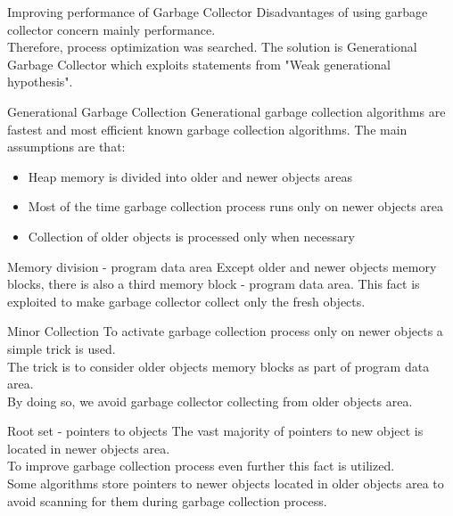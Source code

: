 \documentclass[presentation]{beamer}
\begin{document}
\begin{frame}{Improving performance of Garbage Collector}
	Disadvantages of using garbage collector concern mainly performance. 
	\\Therefore, process optimization was searched.
	\newline
	The solution is Generational Garbage Collector which exploits statements from "Weak generational hypothesis".
\end{frame}


\begin{frame}{Generational Garbage Collection}
	Generational garbage collection algorithms are fastest and most efficient known garbage collection algorithms.
	 The main assumptions are that:
	 \newline
	 \begin{itemize}
	 	\item Heap memory is divided into older and newer objects areas
	 	\item Most of the time garbage collection process runs only on newer objects area
	 	\item Collection of older objects is processed only when necessary
	 \end{itemize}
\end{frame}

\begin{frame}{Memory division - program data area}
	Except older and newer objects memory blocks, there is also a third memory block - program data area.
	\newline
	This fact is exploited to make garbage collector collect only the fresh objects.
\end{frame}

\begin{frame}{Minor Collection}
	To activate garbage collection process only on newer objects a simple trick is used.
	\\
	The trick is to consider older objects memory blocks as part of program data area.
	\\
	By doing so, we avoid garbage collector collecting from older objects area.
\end{frame}

\begin{frame}{Root set - pointers to objects}
	The vast majority of pointers to new object is located in newer objects area.
	\\
	To improve garbage collection process even further this fact is utilized.
	\\
	Some algorithms store pointers to newer objects located in older objects area to avoid scanning for them during garbage collection process.
\end{frame}
\end{document}
